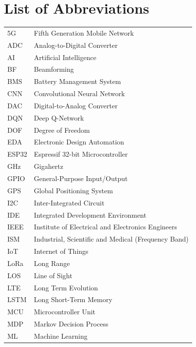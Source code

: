 \newpage
{}
\section*{List of Abbreviations}

\begin{longtable}{@{}p{5cm} p{11cm}}
5G        & Fifth Generation Mobile Network \\[0.2cm]
ADC       & Analog-to-Digital Converter \\[0.2cm]
AI        & Artificial Intelligence \\[0.2cm]
BF        & Beamforming \\[0.2cm]
BMS       & Battery Management System \\[0.2cm]
CNN       & Convolutional Neural Network \\[0.2cm]
DAC       & Digital-to-Analog Converter \\[0.2cm]
DQN       & Deep Q-Network \\[0.2cm]
DOF       & Degree of Freedom \\[0.2cm]
EDA       & Electronic Design Automation \\[0.2cm]
ESP32     & Espressif 32-bit Microcontroller \\[0.2cm]
GHz       & Gigahertz \\[0.2cm]
GPIO      & General-Purpose Input/Output \\[0.2cm]
GPS       & Global Positioning System \\[0.2cm]
I2C       & Inter-Integrated Circuit \\[0.2cm]
IDE       & Integrated Development Environment \\[0.2cm]
IEEE      & Institute of Electrical and Electronics Engineers \\[0.2cm]
ISM       & Industrial, Scientific and Medical (Frequency Band) \\[0.2cm]
IoT       & Internet of Things \\[0.2cm]
LoRa      & Long Range \\[0.2cm]
LOS       & Line of Sight \\[0.2cm]
LTE       & Long Term Evolution \\[0.2cm]
LSTM      & Long Short-Term Memory \\[0.2cm]
MCU       & Microcontroller Unit \\[0.2cm]
MDP       & Markov Decision Process \\[0.2cm]
ML        & Machine Learning \\[0.2cm]

\end{longtable}
